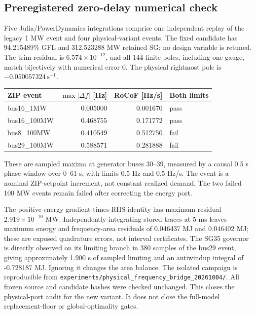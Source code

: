 
\subsection{Preregistered zero-delay numerical check}
Five Julia/PowerDynamics integrations comprise one independent replay of the
legacy 1 MW event and four physical-variant events. The fixed candidate has
94.215489\% GFL and 312.523288 MW retained SG;
no design variable is retuned. The trim residual is
$6.574\times10^{-12}$, and all 144 finite poles,
including one gauge, match bijectively with numerical error
$0$. The physical rightmost pole is
$-0.050057324\,\mathrm{s}^{-1}$.

\begin{center}\begin{tabular}{lrrl}\toprule
ZIP event & $\max|\Delta f|$ [Hz] & RoCoF [Hz/s] & Both limits\\\midrule
bus16\_1MW & 0.005000 & 0.001670 & pass \\
bus16\_100MW & 0.468755 & 0.171772 & pass \\
bus8\_100MW & 0.410549 & 0.512750 & fail \\
bus29\_100MW & 0.588571 & 0.281888 & fail \\
\bottomrule\end{tabular}\end{center}
These are sampled maxima at generator buses 30--39, measured by a causal
0.5 s phase window over 0--61 s, with limits 0.5 Hz and 0.5 Hz/s.
The event is a nominal ZIP-setpoint increment, not constant realized demand.
The two failed 100 MW events remain failed after correcting the energy port.

The positive-energy gradient-times-RHS identity has maximum residual
$2.919\times10^{-10}$ MW. Independently integrating stored
traces at 5 ms leaves maximum energy and frequency-area residuals of
0.046437 MJ and
0.046402 MJ; these are exposed quadrature
errors, not interval certificates. The SG35 governor is directly observed
on its limiting branch in 380 samples of the
bus29 event, giving approximately 1.900 s
of sampled limiting and an antiwindup integral of
-0.728187 MJ. Ignoring it changes the area balance.
The isolated campaign is reproducible from
\texttt{experiments/physical\_frequency\_bridge\_20261004/}.
All frozen source and candidate hashes were checked unchanged.
This closes the physical-port audit for the new variant. It does not close
the full-model replacement-floor or global-optimality gates.
